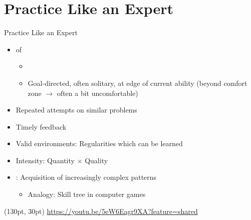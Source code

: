 \documentclass{ercisbeamer}
\begin{document}
\section{Practice Like an Expert}
\begin{frame}{Practice Like an Expert}
    \begin{tbox}
        \begin{itemize}
            \item {} of  
            \begin{itemize}
                \item {}
                \item Goal-directed, often solitary, at edge of current ability (beyond comfort zone $\rightarrow$ often a bit uncomfortable)
            \end{itemize}
            \item Repeated attempts on similar problems
            \item Timely feedback
            \item Valid environments: Regularities which can be learned
            \item Intensity: Quantity $\times$ Quality
            \item {}: Acquisition of increasingly complex patterns
            \begin{itemize}
                \item Analogy: Skill tree in computer games
            \end{itemize}
        \end{itemize}
    \end{tbox}
    \begin{textblock*}{200pt}(130pt, 30pt)
        \tiny \url{https://youtu.be/5eW6Eagr9XA?feature=shared}
    \end{textblock*}
\end{frame}
\setbgimage{}



\sources
\end{document}

